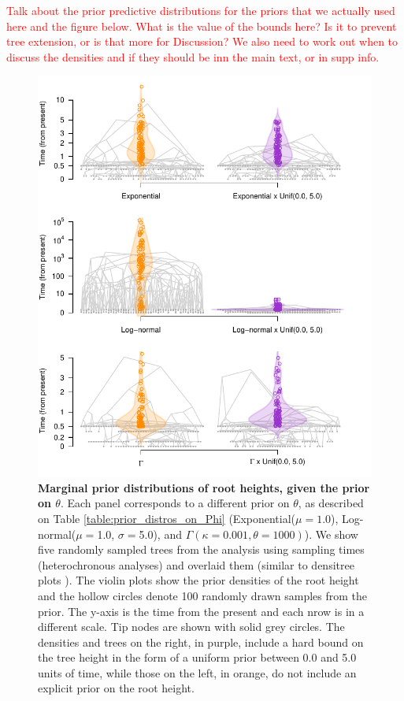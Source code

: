 \documentclass[10pt,letterpaper]{article}
\begin{document}
\textcolor{red}{Talk about the prior predictive distributions for the priors that we actually used here and the figure below. What is the value of the bounds here? Is it to prevent tree extension, or is that more for Discussion? We also need to work out when to discuss the densities and if they should be inn the main text, or in supp info.}

\begin{figure}[!h]
	\begin{center}
		\includegraphics[width=13.5cm]{sandbox_figures/prior_tree_distros.pdf}\newline
		\vspace{-0.5cm}
		\caption{\textbf{Marginal prior distributions of root heights, given the prior on $\theta$}. Each panel corresponds to a different prior on $\theta$, as described on Table \ref{table:prior_distros_on_Phi} (Exponential($\mu=1.0$), Log-normal($\mu=$1.0, $\sigma=$5.0), and $\Gamma(\kappa=0.001, \theta=1000)$). We show five randomly sampled trees from the analysis using sampling times (heterochronous analyses) and overlaid them (similar to densitree plots \cite{bouckaert2010densitree}). The violin plots show the prior densities of the root height and the hollow circles denote 100 randomly drawn samples from the prior. The y-axis is the time from the present and each nrow is in a different scale. Tip nodes are shown with solid grey circles. The densities and trees on the right, in purple, include a hard bound on the tree height in the form of a uniform prior between 0.0 and 5.0 units of time, while those on the left, in orange, do not include an explicit prior on the root height.}
		\label{figure:prior_tree_distros}
	\end{center}
\end{figure}
\end{document}
